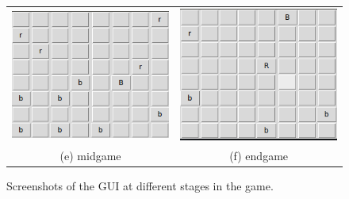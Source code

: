 \documentclass{article}
\begin{document}
\begin{figure}
\begin{tabular}{cc}
 \includegraphics[width=65mm]{images/game-4.png} &   \includegraphics[width=65mm]{images/game-5.png} \\
 (e) midgame & (f) endgame \\[6pt]
\end{tabular}
\caption{Screenshots of the GUI at different stages in the game.}
\label{fig:game}
\end{figure}
\end{document}
